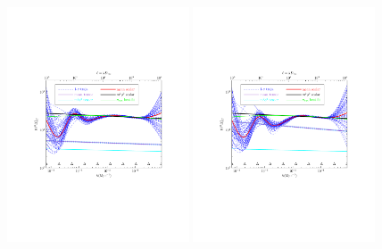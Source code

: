 \documentclass[11pt]{article}
\def \halffigwidth{0.48\textwidth}
\begin{document}
\begin{figure}
  \includegraphics[width=\halffigwidth,  trim = 1in 2.9in 1in 2.9in]{nobicep_spline0_p11_r0d2_power_traj.pdf}
  \includegraphics[width=\halffigwidth,  trim = 1in 2.9in 1in 2.9in]{nobicep_spline0_p11_r0d5_power_traj.pdf}%

\end{figure}
\end{document}
